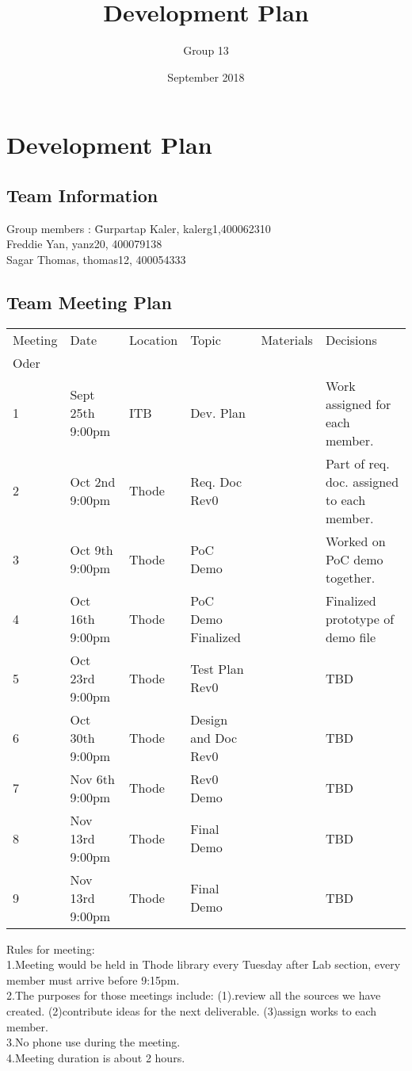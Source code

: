 \documentclass{article}
\title{Development Plan}
\author{Group 13}
\date{September 2018}
\begin{document}
\maketitle
\section{Development Plan}
\subsection{Team Information}
\begin{tabbing}
Group members : \= Gurpartap Kaler,  kalerg1,400062310\\
		      \> Freddie Yan,   yanz20, 400079138\\
		      \> Sagar Thomas,   thomas12, 400054333
\end{tabbing}

\subsection{Team Meeting Plan}
\begin{tabularx}{\textwidth}{|X|X|X|X|X|X|}
    \hline
    Meeting & Date & Location & Topic & Materials & Decisions\\
     Oder &&&&&  \\
     \hline
     1 & Sept 25th 9:00pm & ITB & Dev. Plan &  & Work assigned for each member.\\
     \hline
     2 & Oct 2nd 9:00pm & Thode & Req. Doc Rev0 &  & Part of req. doc. assigned to each member. \\
     \hline
     3 & Oct 9th 9:00pm & Thode & PoC Demo & & Worked on PoC demo together. \\
     \hline
     4 & Oct 16th 9:00pm & Thode & PoC Demo Finalized & & Finalized prototype of demo file \\
     \hline
     5 & Oct 23rd 9:00pm & Thode & Test Plan Rev0 & & TBD\\
     \hline
     6 & Oct 30th 9:00pm & Thode & Design and Doc Rev0 & &TBD\\
     \hline
     7 & Nov 6th 9:00pm & Thode & Rev0 Demo & &TBD\\
     \hline
     8 & Nov 13rd 9:00pm & Thode & Final Demo & &TBD\\
     \hline
    9 & Nov 13rd 9:00pm & Thode & Final Demo & &TBD\\
     \hline

\end{tabularx}
     Rules for meeting:\\
     1.Meeting would be held in Thode library every Tuesday after Lab section, every member must arrive before 9:15pm. \\
     2.The purposes for those meetings include: (1).review all the sources we have created. (2)contribute ideas for the next deliverable. (3)assign works to each member.\\
     3.No phone use during the meeting.\\
     4.Meeting duration is about 2 hours.
\end{document}

